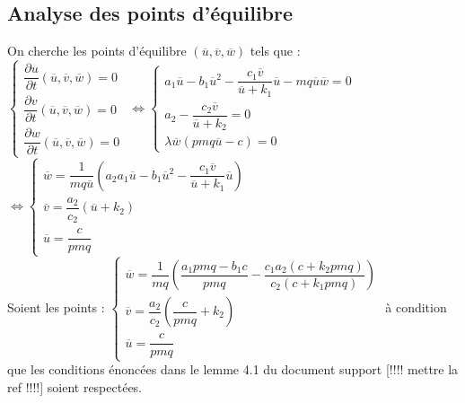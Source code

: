 \documentclass[a4paper, 11pt]{report}%
\begin{document}
        \subsection{Analyse des points d'équilibre}
        On cherche les points d'équilibre $  \left( \overline{u},  \overline{v}, \overline{w} \right)$ tels que :\\
        $ \left\{
            \begin{array}{ll}
                \dfrac{\partial u}{\partial t} \left( \overline{u},  \overline{v}, \overline{w} \right) =0 \\
                \dfrac{\partial v}{\partial t} \left( \overline{u},  \overline{v}, \overline{w} \right) = 0\\
                \dfrac{\partial w}{\partial t}  \left( \overline{u},  \overline{v}, \overline{w} \right) = 0
            \end{array}
        \right.$
        $ \Leftrightarrow \left\{ 
        	\begin{array}{ll}
                a_1 \overline{u} - b_1 \overline{u}^2 - \dfrac{c_1 \overline{v}}{\overline{u} + k_1} \overline{u} - mq \overline{u} \overline{w} =0 \\
                a_2 - \dfrac{c_2 \overline{v}}{\overline{u} + k_2} = 0\\
                \lambda \overline{w} \left( pmq \overline{u} - c \right) = 0
            \end{array}
        \right.$
        $ \Leftrightarrow \left\{ 
        	\begin{array}{ll}
                \overline{w} =  \dfrac{1}{mq \overline{u}} \left(a_2 a_1 \overline{u} - b_1 \overline{u}^2 - \dfrac{c_1 \overline{v}}{\overline{u} + k_1} \overline{u} \right)\\
                \overline{v} = \dfrac{a_2}{c_2} \left( \overline{u} + k_2 \right)\\
                \overline{u} = \dfrac{c}{pmq}
            \end{array}
        \right.$
        \\
            Soient les points :
            $\left\{ 
        	\begin{array}{ll}
                \overline{w} = \dfrac{1}{mq} \left(  \dfrac{a_1pmq-b_1c}{pmq} - \dfrac{c_1a_2(c+k_2pmq)}{c_2(c+k_1pmq)}    \right)\\
                \overline{v} =  \dfrac{a_2}{c_2} \left( \dfrac{c}{pmq} + k_2 \right)\\
                \overline{u} = \dfrac{c}{pmq}
            \end{array}
        \right.$
        à condition que les conditions énoncées dans le lemme 4.1 du document support \cite{} [!!!! mettre la ref !!!!] soient respectées.
        
\end{document}
